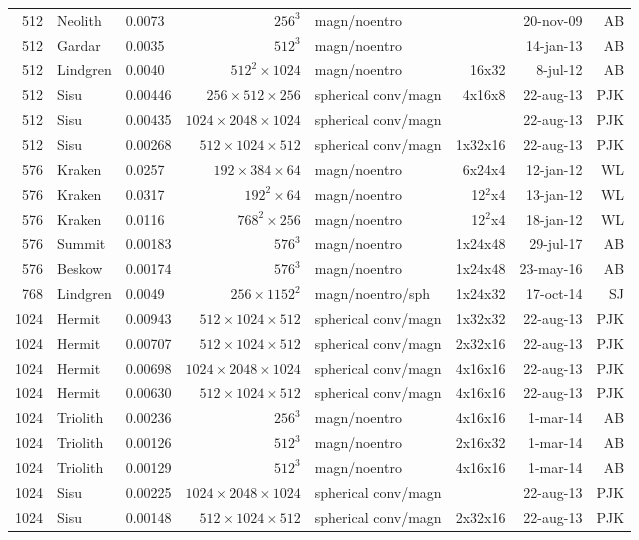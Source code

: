 \documentclass[\mydriver,12pt,twoside,notitlepage,a4paper]{article}
\begin{document}
\begin{center}
\begin{footnotesize}
\begin{longtable}{rllrlrrr}
 512 &Neolith&0.0073& $256^3$ & magn/noentro &        & 20-nov-09 & AB \\
 512 &Gardar &0.0035& $512^3$ & magn/noentro &        & 14-jan-13 & AB \\
 512 &Lindgren&0.0040&$512^2{\!\times\!}1024$&magn/noentro&16x32& 8-jul-12 & AB \\
 512&Sisu&0.00446&$256{\!\times\!}512{\!\times\!}256$&spherical conv/magn&4x16x8&22-aug-13&PJK\\
 512&Sisu&0.00435&$1024{\!\times\!}2048{\!\times\!}1024$&spherical conv/magn& &22-aug-13&PJK\\
 512&Sisu&0.00268&$512{\!\times\!}1024{\!\times\!}512$&spherical conv/magn&1x32x16&22-aug-13&PJK\\
 576 &Kraken&0.0257&$192{\!\times\!}384{\!\times\!}64$&magn/noentro&6x24x4&12-jan-12&WL\\
 576 &Kraken& 0.0317  &$192^2{\!\times\!}64$ & magn/noentro & 12$^2$x4 &13-jan-12 & WL\\
 576 &Kraken& 0.0116  &$768^2{\!\times\!}256$ & magn/noentro & 12$^2$x4 &18-jan-12 & WL\\
 576&Summit&0.00183&$576^3$&magn/noentro&1x24x48&29-jul-17& AB \\
 576&Beskow&0.00174&$576^3$&magn/noentro&1x24x48&23-may-16& AB \\
 768 &Lindgren&0.0049&$256{\!\times\!}1152^2$&magn/noentro/sph&1x24x32& 17-oct-14 & SJ \\
1024&Hermit&0.00943&$512{\!\times\!}1024{\!\times\!}512$&spherical conv/magn&1x32x32&22-aug-13&PJK\\
1024&Hermit&0.00707&$512{\!\times\!}1024{\!\times\!}512$&spherical conv/magn&2x32x16&22-aug-13&PJK\\
1024&Hermit&0.00698&$1024{\!\times\!}2048{\!\times\!}1024$&spherical conv/magn&4x16x16&22-aug-13&PJK\\
1024&Hermit&0.00630&$512{\!\times\!}1024{\!\times\!}512$&spherical conv/magn&4x16x16&22-aug-13&PJK\\
1024 &Triolith&0.00236&$256^3$ & magn/noentro & 4x16x16&  1-mar-14 & AB \\
1024 &Triolith&0.00126&$512^3$ & magn/noentro & 2x16x32&  1-mar-14 & AB \\
1024 &Triolith&0.00129&$512^3$ & magn/noentro & 4x16x16&  1-mar-14 & AB \\
1024&Sisu&0.00225&$1024{\!\times\!}2048{\!\times\!}1024$&spherical conv/magn& &22-aug-13&PJK\\
1024&Sisu&0.00148&$512{\!\times\!}1024{\!\times\!}512$&spherical conv/magn&2x32x16&22-aug-13&PJK\\

\end{longtable}
\end{footnotesize}
\end{center}
\end{document}
